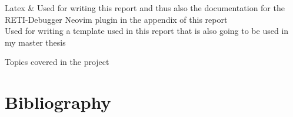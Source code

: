 \documentclass{report}
\begin{document}
\begin{table}[H]
\begin{tblr}
		Latex                  & {\hspace{\dimexpr\labelsep+0.5\tabcolsep}Used for writing this report and thus also the documentation for the RETI-Debugger Neovim plugin in the appendix of this report                                                                                                                  \\\hspace{\dimexpr\labelsep+0.5\tabcolsep}Used for writing a template used in this report that is also going to be used in my master thesis}\\
	\end{tblr}
	\caption{Topics covered in the project}
	\label{tab:topics}
\end{table}

\vspace{0.5cm}
\chapter{Bibliography}
\printbibliography[heading=none]
\end{document}
